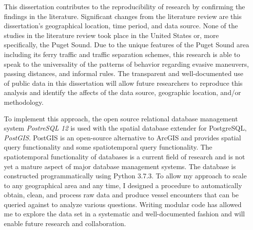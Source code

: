 \documentclass[twoside,symmetric,notoc]{tufte-book}
\begin{document}
\par{%
This dissertation contributes to the reproducibility of research by confirming the findings in the literature. Significant changes from the literature review are this dissertation's geographical location, time period, and data source. None of the studies in the literature review took place in the United States or, more specifically, the Puget Sound. Due to the unique features of the Puget Sound area including its ferry traffic and traffic separation schemes, this research is able to speak to the universality of the patterns of behavior regarding evasive maneuvers, passing distances, and informal rules. The transparent and well-documented use of public data in this dissertation will allow future researchers to reproduce this analysis and identify the affects of the data source, geographic location, and/or methodology.
}
\par{%
To implement this approach, the open source relational database management system \textit{PostreSQL 12} is used with the spatial database extender for PostgreSQL, \textit{PostGIS}. PostGIS is an open-source alternative to ArcGIS and provides spatial query functionality  and some spatiotemporal query functionality. The spatiotemporal functionality of databases is a current field of research and is not yet a mature aspect of major database management systems.\cite{Simoes} The database is constructed programmatically using Python 3.7.3. To allow my approach to scale to any geographical area and any time, I designed a procedure to automatically obtain, clean, and process raw data and produce vessel encounters that can be queried against to analyze various questions. Writing modular code has allowed me to explore the data set in a systematic and well-documented fashion and will enable future research and collaboration.
}
\end{document}
